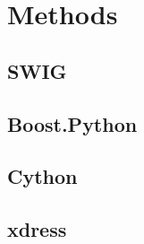 \section{Methods} \label{sec:methods}

  \subsection{SWIG} \label{sub:swig}

    \blindtext

  \subsection{Boost.Python} \label{sub:boost_python}

    \blindtext

  \subsection{Cython} \label{sub:cython}

    \blindtext

  \subsection{xdress} \label{sub:xdress}

    \blindtext
